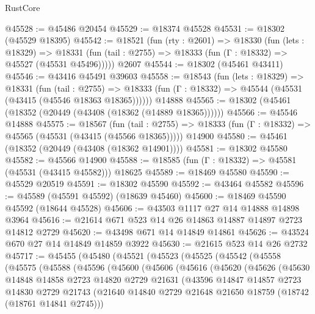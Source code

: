 \begin{lexlean}{RustCore}
\begin{coremodule}
@45528 := @45486 @20454
@45529 := @18374 @45528
@45531 := @18302 (@45529 @18395)
@45542 := @18521
    (fun (rty : @2601) =>
    @18330
      (fun (lets : @18329) =>
      @18331 (fun (tail : @2755) => @18333 (fun (Γ : @18332) => @45527 (@45531 @45496)))))
    @2607
@45544 := @18302 (@45461 @43411)
@45546 := @43416 @45491 @39603
@45558 := @18543
    (fun (lets : @18329) =>
    @18331
      (fun (tail : @2755) =>
      @18333 (fun (Γ : @18332) => @45544 (@45531 (@43415 (@45546 @18363 @18365))))))
    @14888
@45565 := @18302 (@45461 (@18352 (@20449 (@43408 (@18362 (@14889 @18365))))))
@45566 := @45546 @14888
@45575 := @18567
    (fun (tail : @2755) => @18333 (fun (Γ : @18332) => @45565 (@45531 (@43415 (@45566 @18365)))))
    @14900
@45580 := @45461 (@18352 (@20449 (@43408 (@18362 @14901))))
@45581 := @18302 @45580
@45582 := @45566 @14900
@45588 := @18585 (fun (Γ : @18332) => @45581 (@45531 (@43415 @45582))) @18625
@45589 := @18469 @45580
@45590 := @45529 @20519
@45591 := @18302 @45590
@45592 := @43464 @45582
@45596 := @45589 (@45591 @45592) (@18639 @45460)
@45600 := @18469 @45590 @45592 (@18644 @45528)
@45606 := @43503 @1117 @27 @14 @14888 @14898 @3964
@45616 := @21614 @671 @523 @14 @26 @14863 @14887 @14897 @2723 @14812 @2729
@45620 := @43498 @671 @14 @14849 @14861
@45626 := @43524 @670 @27 @14 @14849 @14859 @3922
@45630 := @21615 @523 @14 @26 @2732
@45717 := @45455
    (@45480
      (@45521
        (@45523
          (@45525
            (@45542
              (@45558
                (@45575
                  (@45588
                    (@45596
                      (@45600
                        (@45606
                          (@45616
                            (@45620
                              (@45626
                                (@45630
                                  @14848
                                  @14858
                                  @2723
                                  @14820
                                  @2729
                                  @21631
                                  (@43596
                                    @14847
                                    @14857
                                    @2723
                                    @14830
                                    @2729
                                    @21743
                                    (@21640
                                      @14840
                                      @2729
                                      @21648
                                      @21650
                                      @18759
                                      (@18742 (@18761 @14841 @2745)))

\end{coremodule}
\end{lexlean}
